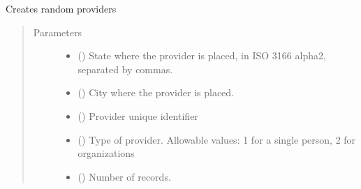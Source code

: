 \documentclass[letterpaper,10pt,english]{sphinxmanual}
\begin{document}
\begin{fulllineitems}
\begin{fulllineitems}
\begin{quote}
\begin{description}
\end{description}\end{quote}

\end{fulllineitems}


\begin{fulllineitems}
\label{\detokenize{CE_app.synth_phr:CE_app.synth_phr.functions.Domains.provider}}
\sphinxAtStartPar
Creates random providers
\begin{quote}\begin{description}
\item[{Parameters}] \leavevmode\begin{itemize}
\item {} 
\sphinxAtStartPar
{} () \textendash{} State where the provider is placed, in ISO 3166 alpha\sphinxhyphen{}2, separated by commas.

\item {} 
\sphinxAtStartPar
{} () \textendash{} City where the provider is placed.

\item {} 
\sphinxAtStartPar
{} () \textendash{} Provider unique identifier

\item {} 
\sphinxAtStartPar
{} () \textendash{} Type of provider. Allowable values: 1 for a single person, 2 for organizations

\item {} 
\sphinxAtStartPar
{} () \textendash{} Number of records.


\end{itemize}
\end{description}
\end{quote}
\end{fulllineitems}
\end{fulllineitems}
\end{document}
